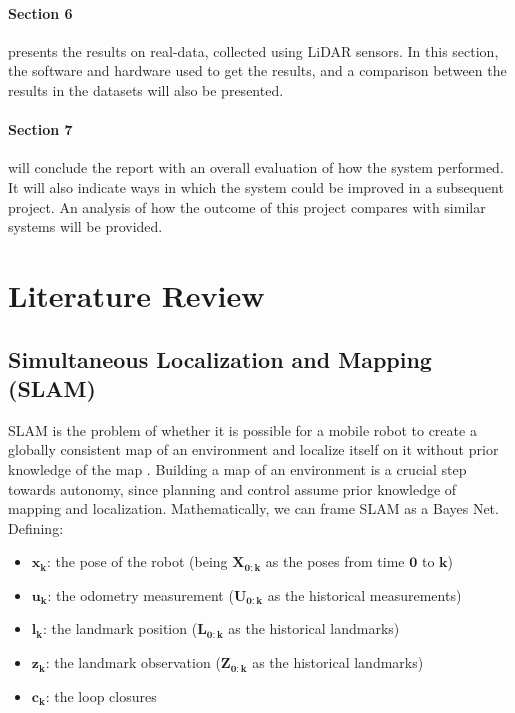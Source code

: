\documentclass[12pt]{article}
\begin{document}
\paragraph{Section 6} presents the results on real-data, collected using LiDAR sensors. In this section, the software and hardware used to get the results, and a comparison between the results in the datasets will also be presented.
		
\paragraph{Section 7} will conclude the report with an overall evaluation of how the system performed. It will also indicate ways in which the system could be improved in a subsequent project. An analysis of how the outcome of this project compares with similar systems will be provided.

	\newpage
	\section{Literature Review}

	\subsection{Simultaneous Localization and Mapping (SLAM)}
	\label{subs:SLAMRev}

SLAM is the problem of whether it is possible for a mobile robot to create a globally consistent map of an environment and localize itself on it without prior knowledge of the map \cite{SLAMPartI}\cite{Cadena}. Building a map of an environment is a crucial step towards autonomy, since planning and control assume prior knowledge of mapping and localization. Mathematically, we can frame SLAM as a Bayes Net. Defining:
	
\begin{itemize}
\item $\mathbf{x_k}$: the pose of the robot (being $\mathbf{X_{0:k}}$ as the poses from time $\mathbf{0}$ to $\mathbf{k}$)
\item $\mathbf{u_k}$: the odometry measurement ($\mathbf{U_{0:k}}$ as the historical measurements)
\item $\mathbf{l_k}$: the landmark position ($\mathbf{L_{0:k}}$ as the historical landmarks)
\item $\mathbf{z_k}$: the landmark observation ($\mathbf{Z_{0:k}}$ as the historical landmarks)
\item $\mathbf{c_k}$: the loop closures
\end{itemize}
\end{document}
